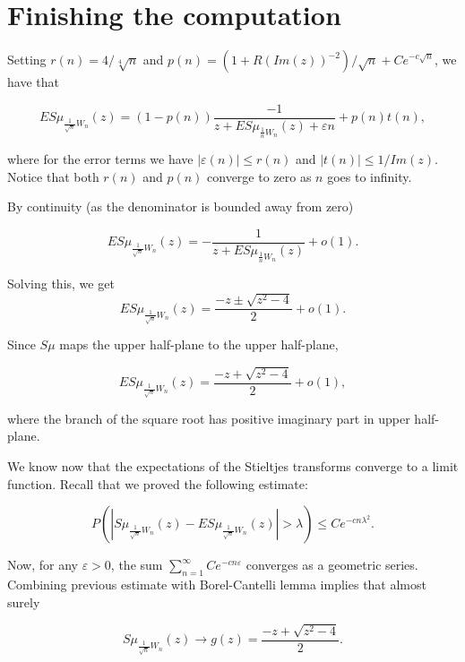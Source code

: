 \documentclass[12pt,a4paper,leqno]{report}
\newcommand{\eps}{\varepsilon}
\theoremstyle{plain}
\theoremstyle{definition}
\theoremstyle{remark}
\begin{document}
\section{Finishing the computation}

Setting $r(n) = 4/\sqrt[4]{n}$ and $p(n)= (1+R(Im(z))^{-2})/\sqrt{n} + Ce^{-c\sqrt{n}}$, we have that

\begin{equation*}
ES\mu_{\frac{1}{\sqrt{n}}W_n}(z) = (1-p(n)) \frac{-1}{z+ES\mu_{\frac{1}{n}W_n}(z) + \eps{n}} + p(n)t(n),
\end{equation*}

where for the error terms we have $|\eps(n)|\leq r(n)$ and $|t(n)| \leq 1/Im(z)$. Notice that both $r(n)$ and $p(n)$ converge to zero as $n$ goes to infinity.


By continuity (as the denominator is bounded away from zero) 

\begin{equation*}
ES\mu_{\frac{1}{\sqrt{n}}W_n}(z) = -\frac{1}{z+ES\mu_{\frac{1}{n}W_n}(z)} + o(1).
\end{equation*}

Solving this, we get
\begin{equation*}
ES\mu_{\frac{1}{\sqrt{n}}W_n}(z) = \frac{-z \pm \sqrt{z^2 - 4}}{2} +o(1).
\end{equation*}

Since $S\mu$ maps the upper half-plane to the upper half-plane,  

\begin{equation*}
ES\mu_{\frac{1}{\sqrt{n}}W_n}(z) = \frac{-z + \sqrt{z^2 - 4}}{2} +o(1),
\end{equation*}

where the branch of the square root has positive imaginary part in upper half-plane.

We know now that the expectations of the Stieltjes transforms converge to a limit function. Recall that we proved the following estimate:

\begin{equation*}
P(|S\mu_{\frac{1}{\sqrt{n}}W_n}(z)- ES\mu_{\frac{1}{\sqrt{n}}W_n}(z)|>\lambda) \leq Ce^{-cn\lambda^2}.
\end{equation*} 

Now, for any $\eps>0$, the sum $\sum_{n=1}^{\infty} Ce^{-cn\varepsilon}$ converges as a geometric series. Combining previous estimate with Borel-Cantelli lemma implies that almost surely

\begin{equation*}
S\mu_{\frac{1}{\sqrt{n}}W_n}(z) \to g(z) = \frac{-z + \sqrt{z^2-4}}{2}.
\end{equation*}
\end{document}
